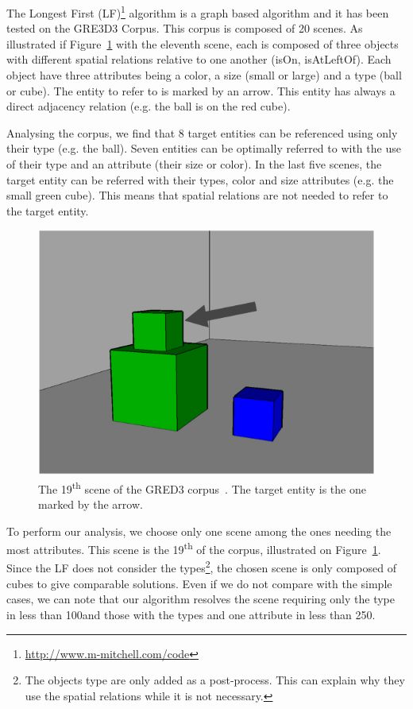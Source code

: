 The Longest First (LF)\footnote{\url{http://www.m-mitchell.com/code}} algorithm \cite{viethen_2013_graphs} is a graph based algorithm and it has been tested on the GRE3D3 Corpus. This corpus is composed of 20 scenes. As illustrated if Figure~\ref{fig:chap4_gred3} with the eleventh scene, each is composed of three objects with different spatial relations relative to one another (isOn, isAtLeftOf). Each object have three attributes being a color, a size (small or large) and a type (ball or cube). The entity to refer to is marked by an arrow. This entity has always a direct adjacency relation (e.g. the ball is on the red cube).

Analysing the corpus, we find that 8 target entities can be referenced using only their type (e.g. the ball). Seven entities can be optimally referred to with the use of their type and an attribute (their size or color). In the last five scenes, the target entity can be referred with their types, color and size attributes (e.g. the small green cube). This means that spatial relations are not needed to refer to the target entity. 

\begin{figure}[ht!]
\centering
\includegraphics[scale=0.3]{figures/chapter4/GRED3.jpg}
\caption{\label{fig:chap4_gred3} The 19\textsuperscript{th} scene of the GRED3 corpus~\cite{dale_2009_referring}. The target entity is the one marked by the arrow.}
\end{figure}

To perform our analysis, we choose only one scene among the ones needing the most attributes. This scene is the 19\textsuperscript{th} of the corpus, illustrated on Figure~\ref{fig:chap4_gred3}. Since the LF does not consider the types\footnote{The objects type are only added as a post-process. This can explain why they use the spatial relations while it is not necessary.}, the chosen scene is only composed of cubes to give comparable solutions. Even if we do not compare with the simple cases, we can note that our algorithm resolves the scene requiring only the type in less than 100\us and those with the types and one attribute in less than 250\us.

